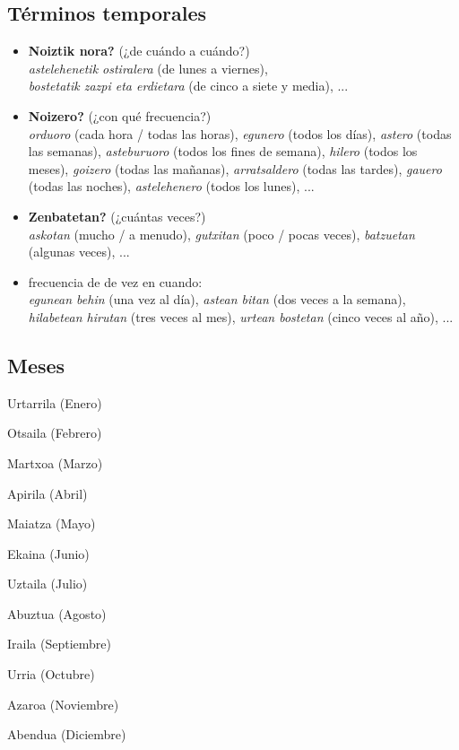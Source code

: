 \documentclass[11pt, a4paper]{article}
\begin{document}
\subsection{T\'erminos temporales}
\begin{itemize}
\item \textbf{Noiztik nora?} (¿de cuándo a cuándo?)\\
\indent \textit{astelehenetik ostiralera} (de lunes a viernes),\\ \textit{bostetatik zazpi eta erdietara} (de cinco a siete y media), ...
\item \textbf{Noizero?} (¿con qué frecuencia?)\\
\textit{orduoro} (cada hora / todas las horas), \textit{egunero} (todos los días), \textit{astero} (todas las semanas), \textit{asteburuoro} (todos los fines de semana), \textit{hilero} (todos los meses), \textit{goizero} (todas las mañanas), \textit{arratsaldero} (todas las tardes), \textit{gauero} (todas las noches), \textit{astelehenero} (todos los lunes), ...
\item \textbf{Zenbatetan?} (¿cuántas veces?)\\
\textit{askotan} (mucho / a menudo), \textit{gutxitan} (poco / pocas veces), \textit{batzuetan} (algunas veces), ...
\item frecuencia de de vez en cuando:\\
\textit{egunean behin} (una vez al día), \textit{astean bitan} (dos veces a la semana), \textit{hilabetean hirutan} (tres veces al mes), \textit{urtean bostetan} (cinco veces al año), ...
\end{itemize}

\subsection{Meses}
\begin{enumerate}
\begin{multicols}{2}
\item Urtarrila (Enero)
\item Otsaila (Febrero)
\item Martxoa (Marzo)
\item Apirila (Abril)
\item Maiatza (Mayo)
\item Ekaina (Junio)
\item Uztaila (Julio)
\item Abuztua (Agosto)
\item Iraila (Septiembre)
\item Urria (Octubre)
\item Azaroa (Noviembre)
\item Abendua (Diciembre)
\end{multicols}
\end{enumerate}
\end{document}
